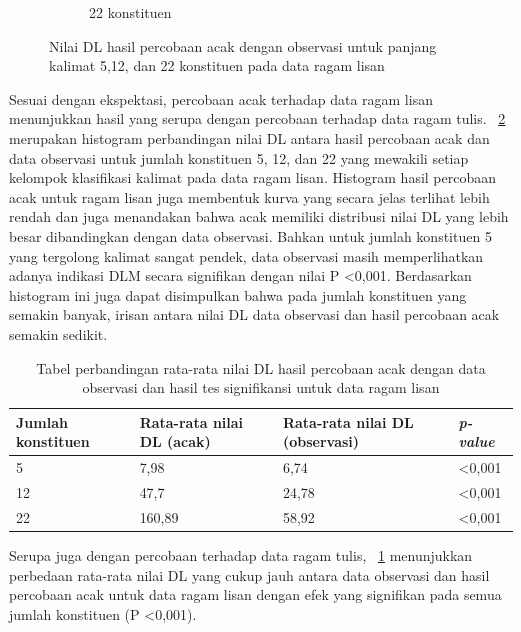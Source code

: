 \begin{figure}
\begin{subfigure}{.45\textwidth}
  \caption{22 konstituen}
  \label{fig:l22randomobs} 
\end{subfigure}

\caption{Nilai DL hasil percobaan acak dengan observasi untuk panjang kalimat 5,12, dan 22 konstituen pada data ragam lisan}
\label{fig:lrandomobs}
\end{figure}

Sesuai dengan ekspektasi, percobaan acak terhadap data ragam lisan menunjukkan hasil yang serupa dengan percobaan terhadap data ragam tulis. \pic~\ref{fig:lrandomobs} merupakan histogram perbandingan nilai DL antara hasil percobaan acak dan data observasi untuk jumlah konstituen 5, 12, dan 22 yang mewakili setiap kelompok klasifikasi kalimat pada data ragam lisan. Histogram hasil percobaan acak untuk ragam lisan juga membentuk kurva yang secara jelas terlihat lebih rendah dan juga menandakan bahwa  acak memiliki distribusi nilai DL yang lebih besar dibandingkan dengan data observasi. Bahkan untuk jumlah konstituen 5 yang tergolong kalimat sangat pendek, data observasi masih memperlihatkan adanya indikasi DLM secara signifikan dengan nilai P \textless 0,001. Berdasarkan histogram ini juga dapat disimpulkan bahwa pada jumlah konstituen yang semakin banyak, irisan antara nilai DL data observasi dan hasil percobaan acak semakin sedikit.

\begin{table}
\begin{center}
\begin{small}
  \caption{Tabel perbandingan rata-rata nilai DL hasil percobaan acak dengan data observasi dan hasil tes signifikansi untuk data ragam lisan}  \label{tab:perbandingan_DL_lisan}
  \begin{tabular}{ | l | l | l | l |}
    \hline
	 Jumlah konstituen & Rata-rata nilai DL (acak) & Rata-rata nilai DL (observasi) & \textit{p-value} \\ \hline
	 5 & 7,98 & 6,74 & \textless 0,001 \\ \hline
	 12 & 47,7 & 24,78 & \textless 0,001 \\ \hline
	 22 & 160,89 & 58,92 & \textless 0,001 \\ \hline
  \end{tabular}
  \end{small}
\end{center}
\end{table}

Serupa juga dengan percobaan terhadap data ragam tulis, \tab~\ref{tab:perbandingan_DL_lisan} menunjukkan perbedaan rata-rata nilai DL yang cukup jauh antara data observasi dan hasil percobaan acak untuk data ragam lisan dengan efek yang signifikan pada semua jumlah konstituen (P \textless 0,001).

